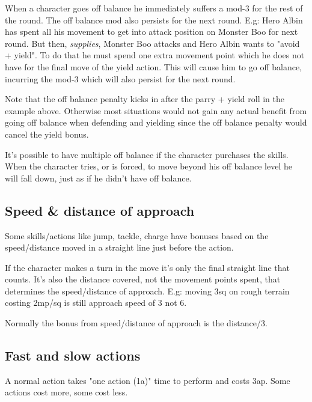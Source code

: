 When a character goes off balance he immediately suffers a mod-3 for the rest of the round. The off balance mod also persists for the next round. E.g: Hero Albin has spent all his movement to get into attack position on Monster Boo for next round. But then, \emph{supplies}, Monster Boo attacks and Hero Albin wants to "avoid + yield". To do that he must spend one extra movement point which he does not have for the final move of the yield action. This will cause him to go off balance, incurring the mod-3 which will also persist for the next round.

Note that the off balance penalty kicks in after the parry + yield roll in the example above. Otherwise most situations would not gain any actual benefit from going off balance when defending and yielding since the off balance penalty would cancel the yield bonus.

It's possible to have multiple off balance if the character purchases the skills.
When the character tries, or is forced, to move beyond his off balance level he will fall down, just as if he didn't have off balance.


\subsection*{Speed \& distance of approach}
\label{sec:approach}
Some skills/actions like jump, tackle, charge have bonuses based on the speed/distance moved in a straight line just before the action.

If the character makes a turn in the move it's only the final straight line that counts. It's also the distance covered, not the movement points spent, that determines the speed/distance of approach. E.g: moving 3sq on rough terrain costing 2mp/sq is still approach speed of 3 not 6.

Normally the bonus from speed/distance of approach is the distance/3.















\subsection*{Fast and slow actions}
A normal action takes "one action (1a)" time to perform and costs 3ap. Some actions cost more, some cost less.

